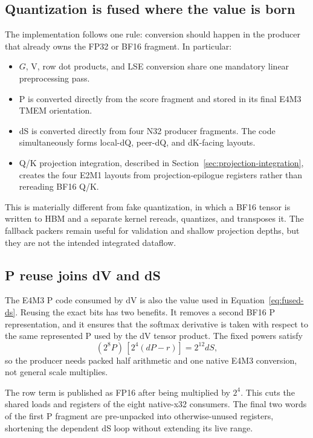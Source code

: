 \subsection{Quantization is fused where the value is born}

The implementation follows one rule: conversion should happen in the producer
that already owns the FP32 or BF16 fragment.  In particular:

\begin{itemize}
  \item $G$, V, row dot products, and LSE conversion share one mandatory
  linear preprocessing pass.
  \item P is converted directly from the score fragment and stored in its
  final E4M3 TMEM orientation.
  \item dS is converted directly from four N32 producer fragments.  The code
  simultaneously forms local-dQ, peer-dQ, and dK-facing layouts.
  \item Q/K projection integration, described in
  Section~\ref{sec:projection-integration}, creates the four E2M1 layouts from
  projection-epilogue registers rather than rereading BF16 Q/K.
\end{itemize}

This is materially different from fake quantization, in which a BF16 tensor
is written to HBM and a separate kernel rereads, quantizes, and transposes it.
The fallback packers remain useful for validation and shallow projection
depths, but they are not the intended integrated dataflow.

\subsection{P reuse joins dV and dS}

The E4M3 P code consumed by dV is also the value used in
Equation~\ref{eq:fused-ds}.  Reusing the exact bits has two benefits.  It
removes a second BF16 P representation, and it ensures that the softmax
derivative is taken with respect to the same represented P used by the dV
tensor product.  The fixed powers satisfy
\begin{equation}
  (2^8P)\,[2^4(dP-r)] = 2^{12}dS,
  \label{eq:scale-factorization}
\end{equation}
so the producer needs packed half arithmetic and one native E4M3 conversion,
not general scale multiplies.

The row term is published as FP16 after being multiplied by $2^4$.  This cuts
the shared loads and registers of the eight native-x32 consumers.  The final
two words of the first P fragment are pre-unpacked into otherwise-unused
registers, shortening the dependent dS loop without extending its live range.

